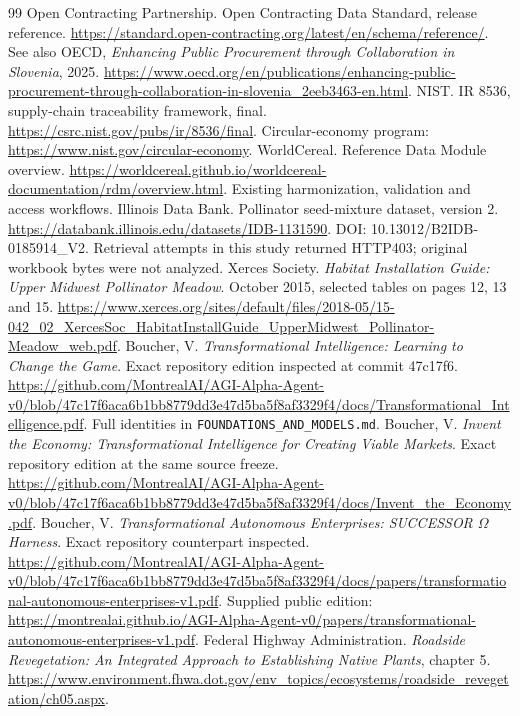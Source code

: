 \documentclass[11pt]{article}
\newcommand{\file}[1]{\texttt{#1}}
\begin{document}
\begin{thebibliography}{99}
 Open Contracting Partnership. Open Contracting Data Standard, release reference. \url{https://standard.open-contracting.org/latest/en/schema/reference/}. See also OECD, \emph{Enhancing Public Procurement through Collaboration in Slovenia}, 2025. \url{https://www.oecd.org/en/publications/enhancing-public-procurement-through-collaboration-in-slovenia_2eeb3463-en.html}.
 NIST. IR 8536, supply-chain traceability framework, final. \url{https://csrc.nist.gov/pubs/ir/8536/final}. Circular-economy program: \url{https://www.nist.gov/circular-economy}.
 WorldCereal. Reference Data Module overview. \url{https://worldcereal.github.io/worldcereal-documentation/rdm/overview.html}. Existing harmonization, validation and access workflows.
 Illinois Data Bank. Pollinator seed-mixture dataset, version 2. \url{https://databank.illinois.edu/datasets/IDB-1131590}. DOI: 10.13012/B2IDB-0185914\_V2. Retrieval attempts in this study returned HTTP403; original workbook bytes were not analyzed.
 Xerces Society. \emph{Habitat Installation Guide: Upper Midwest Pollinator Meadow}. October 2015, selected tables on pages 12, 13 and 15. \url{https://www.xerces.org/sites/default/files/2018-05/15-042_02_XercesSoc_HabitatInstallGuide_UpperMidwest_Pollinator-Meadow_web.pdf}.
 Boucher, V. \emph{Transformational Intelligence: Learning to Change the Game}. Exact repository edition inspected at commit 47c17f6. \url{https://github.com/MontrealAI/AGI-Alpha-Agent-v0/blob/47c17f6aca6b1bb8779dd3e47d5ba5f8af3329f4/docs/Transformational_Intelligence.pdf}. Full identities in \file{FOUNDATIONS_AND_MODELS.md}.
 Boucher, V. \emph{Invent the Economy: Transformational Intelligence for Creating Viable Markets}. Exact repository edition at the same source freeze. \url{https://github.com/MontrealAI/AGI-Alpha-Agent-v0/blob/47c17f6aca6b1bb8779dd3e47d5ba5f8af3329f4/docs/Invent_the_Economy.pdf}.
 Boucher, V. \emph{Transformational Autonomous Enterprises: SUCCESSOR $\Omega$ Harness}. Exact repository counterpart inspected. \url{https://github.com/MontrealAI/AGI-Alpha-Agent-v0/blob/47c17f6aca6b1bb8779dd3e47d5ba5f8af3329f4/docs/papers/transformational-autonomous-enterprises-v1.pdf}. Supplied public edition: \url{https://montrealai.github.io/AGI-Alpha-Agent-v0/papers/transformational-autonomous-enterprises-v1.pdf}.
 Federal Highway Administration. \emph{Roadside Revegetation: An Integrated Approach to Establishing Native Plants}, chapter 5. \url{https://www.environment.fhwa.dot.gov/env_topics/ecosystems/roadside_revegetation/ch05.aspx}.

\end{thebibliography}
\end{document}
